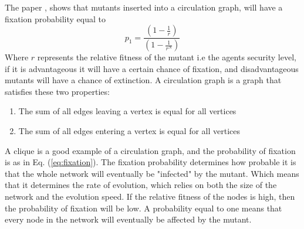 The paper \cite{lieberman2005evolutionary}, shows that mutants inserted into a circulation graph, will have a fixation probability equal to
\begin{equation}  
p_{1}=\frac{(1-\frac{1}{r})}{(1-\frac{1}{r^{N}})}
 \label{eq:fixation} 
\end{equation}
Where $r$ represents the relative fitness of the mutant i.e the agents security level, if it is advantageous it will have a certain chance of fixation, and disadvantageous mutants will have a chance of extinction. A circulation graph is a graph that satisfies these two properties: 
\begin{enumerate}
\item The sum of all edges leaving a vertex is equal for all vertices
\item The sum of all edges entering a vertex is equal for all vertices
\end{enumerate}
A clique is a good example of a circulation graph, and the probability of fixation is as in Eq. (\ref{eq:fixation}).
The fixation probability determines how probable it is that the whole network will eventually be
"infected" by the mutant. Which means that it determines the rate of evolution, which relies on both the size of the
network and the evolution speed. 
If the relative fitness of the nodes is high, then the probability of fixation will be low.
A probability equal to one means that every node in the network will eventually be affected by the mutant.

